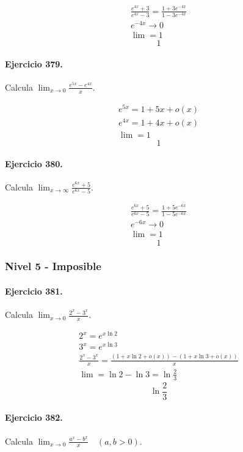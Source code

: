 \documentclass[11pt,a4paper]{article}
\begin{document}
\[
\begin{aligned}
\frac{e^{4x}+3}{e^{4x}-3}=\frac{1+3e^{-4x}}{1-3e^{-4x}}\\
e^{-4x}\to0\\
\lim=1
\end{aligned}
\]
\[\boxed{1}\]


\paragraph{Ejercicio 379.} Calcula $\displaystyle\lim_{x\to0}\frac{e^{5x}-e^{4x}}{x}$.

\[
\begin{aligned}
e^{5x}=1+5x+o(x)\\
e^{4x}=1+4x+o(x)\\
\lim=1
\end{aligned}
\]
\[\boxed{1}\]


\paragraph{Ejercicio 380.} Calcula $\displaystyle\lim_{x\to\infty}\frac{e^{6x}+5}{e^{6x}-5}$.

\[
\begin{aligned}
\frac{e^{6x}+5}{e^{6x}-5}=\frac{1+5e^{-6x}}{1-5e^{-6x}}\\
e^{-6x}\to0\\
\lim=1
\end{aligned}
\]
\[\boxed{1}\]


\newpage

\subsubsection*{Nivel 5 - Imposible}

\paragraph{Ejercicio 381.} Calcula $\displaystyle \lim_{x\to0}\frac{2^x-3^x}{x}$.

\[
\begin{aligned}
2^x=e^{x\ln2}\\
3^x=e^{x\ln3}\\
\frac{2^x-3^x}{x}=\frac{(1+x\ln2+o(x))-(1+x\ln3+o(x))}{x}\\
\lim=\ln2-\ln3=\ln\frac23
\end{aligned}
\]
\[\boxed{\ln\frac23}\]


\paragraph{Ejercicio 382.} Calcula $\displaystyle \lim_{x\to0}\frac{a^x-b^x}{x}\quad(a,b>0)$.
\end{document}
